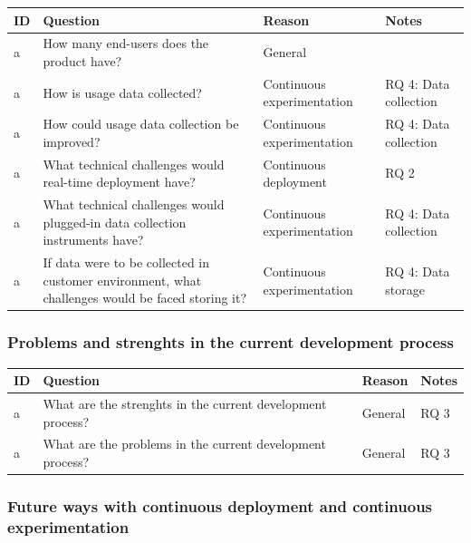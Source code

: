 \documentclass[english]{tktltiki2}
\theoremstyle{definition}
\theoremstyle{remark}
\begin{document}
\begin{center}
    \begin{tabular}{ | l | l | l | p{5cm} |}
    \hline
    ID & Question & Reason & Notes \\ \hline
    a & How many end-users does the product have? & General &  \\ \hline
    a & How is usage data collected? & Continuous experimentation & RQ 4: Data collection \\ \hline
    a & How could usage data collection be improved? & Continuous experimentation & RQ 4: Data collection \\ \hline

    a & What technical challenges would real-time deployment have? & Continuous deployment & RQ 2 \\ \hline
    a & What technical challenges would plugged-in data collection instruments have? & Continuous experimentation & RQ 4: Data collection \\ \hline
    a & If data were to be collected in customer environment, what challenges would be faced storing it? & Continuous experimentation & RQ 4: Data storage \\ \hline
    \hline
    \end{tabular}
\end{center}

\subsubsection{Problems and strenghts in the current development process}

\begin{center}
    \begin{tabular}{ | l | l | l | p{5cm} |}
    \hline
    ID & Question & Reason & Notes \\ \hline
	a & What are the strenghts in the current development process? & General & RQ 3 \\ \hline
    a & What are the problems in the current development process? & General & RQ 3 \\ \hline
    \hline
    \end{tabular}
\end{center}

\subsubsection{Future ways with continuous deployment and continuous experimentation}
\end{document}

